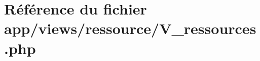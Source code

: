 \hypertarget{_v__ressources_8php}{}\section{Référence du fichier app/views/ressource/\+V\+\_\+ressources.php}
\label{_v__ressources_8php}
